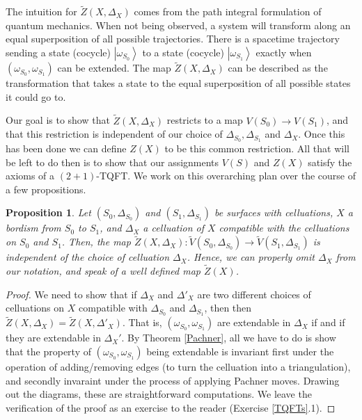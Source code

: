 \documentclass{article}
\newtheorem{proposition}{Proposition}[section]
\theoremstyle{definition}
\numberwithin{figure}{section}
\begin{document}
The intuition for $\tilde{Z}(X,\Delta_X)$ comes from the path integral formulation of quantum mechanics. When not being observed, a system will transform along an equal superposition of all possible trajectories. There is a spacetime trajectory sending a state (cocycle) $\left|\omega_{S_0}\right>$ to a state (cocycle) $\left|\omega_{S_1}\right>$ exactly when $(\omega_{S_0},\omega_{S_1})$ can be extended. The map $\tilde{Z}(X,\Delta_X)$ can be described as the transformation that takes a state to the equal superposition of all possible states it could go to.

Our goal is to show that $\tilde{Z}(X,\Delta_{X})$ restricts to a map $V(S_0)\xrightarrow{}V(S_1)$, and that this restriction is independent of our choice of $\Delta_{S_0}, \Delta_{S_1}$ and $\Delta_{X}$. Once this has been done we can define $Z(X)$ to be this common restriction. All that will be left to do then is to show that our assignments $V(S)$ and $Z(X)$ satisfy the axioms of a $(2+1)$-TQFT. We work on this overarching plan over the course of a few propositions.

\begin{proposition}\label{Celluation independent}
Let $(S_0,\Delta_{S_0})$ and $\left(S_1,\Delta_{S_1}\right)$ be surfaces with celluations, $X$ a bordism from $S_0$ to $S_1$, and $\Delta_X$ a celluation of $X$ compatible with the celluations on $S_0$ and $S_1$. Then, the map $\tilde{Z}(X,\Delta_X): \tilde{V}(S_0,\Delta_{S_0})\xrightarrow{}\tilde{V}(S_1,\Delta_{S_1})$ is independent of the choice of celluation $\Delta_X$. Hence, we can properly omit $\Delta_X$ from our notation, and speak of a well defined map $\tilde{Z}(X)$.
\end{proposition}
\begin{proof} We need to show that if $\Delta_X$ and $\Delta'_X$ are two different choices of celluations on $X$ compatible with $\Delta_{S_0}$ and $\Delta_{S_1}$, then then $\tilde{Z}(X,\Delta_X)=\tilde{Z}(X,\Delta'_X)$. That is, $(\omega_{S_0},\omega_{S_1})$ are extendable in $\Delta_X$ if and if they are extendable in $\Delta_X'$. By Theorem \ref{Pachner}, all we have to do is show that the property of $(\omega_{S_0},\omega_{S_1})$ being extendable is invariant first under the operation of adding/removing edges (to turn the celluation into a triangulation), and secondly invaraint under the process of applying Pachner moves. Drawing out the diagrams, these are straightforward computations. We leave the verification of the proof as an exercise to the reader (Exercise \ref{TQFTs}.1).
\end{proof}
\end{document}
